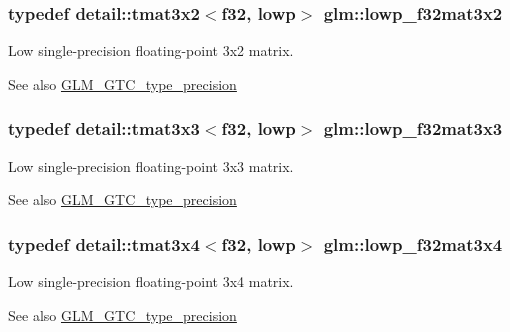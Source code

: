 \subsubsection[{\texorpdfstring{lowp\+\_\+f32mat3x2}{lowp_f32mat3x2}}]{\setlength{\rightskip}{0pt plus 5cm}typedef detail\+::tmat3x2$<$f32, lowp$>$ {\bf glm\+::lowp\+\_\+f32mat3x2}}\hypertarget{group__gtc__type__precision_gadf8ee4630e8d2b6ae72293a7c8dff497}{}\label{group__gtc__type__precision_gadf8ee4630e8d2b6ae72293a7c8dff497}
Low single-\/precision floating-\/point 3x2 matrix. \begin{DoxySeeAlso}{See also}
\hyperlink{group__gtc__type__precision}{G\+L\+M\+\_\+\+G\+T\+C\+\_\+type\+\_\+precision} 
\end{DoxySeeAlso}
\subsubsection[{\texorpdfstring{lowp\+\_\+f32mat3x3}{lowp_f32mat3x3}}]{\setlength{\rightskip}{0pt plus 5cm}typedef detail\+::tmat3x3$<$f32, lowp$>$ {\bf glm\+::lowp\+\_\+f32mat3x3}}\hypertarget{group__gtc__type__precision_ga92f4b130a9651c69361600272f113542}{}\label{group__gtc__type__precision_ga92f4b130a9651c69361600272f113542}
Low single-\/precision floating-\/point 3x3 matrix. \begin{DoxySeeAlso}{See also}
\hyperlink{group__gtc__type__precision}{G\+L\+M\+\_\+\+G\+T\+C\+\_\+type\+\_\+precision} 
\end{DoxySeeAlso}
\subsubsection[{\texorpdfstring{lowp\+\_\+f32mat3x4}{lowp_f32mat3x4}}]{\setlength{\rightskip}{0pt plus 5cm}typedef detail\+::tmat3x4$<$f32, lowp$>$ {\bf glm\+::lowp\+\_\+f32mat3x4}}\hypertarget{group__gtc__type__precision_ga7f81032f05c8a1b96b33c328f38c72d3}{}\label{group__gtc__type__precision_ga7f81032f05c8a1b96b33c328f38c72d3}
Low single-\/precision floating-\/point 3x4 matrix. \begin{DoxySeeAlso}{See also}
\hyperlink{group__gtc__type__precision}{G\+L\+M\+\_\+\+G\+T\+C\+\_\+type\+\_\+precision} 
\end{DoxySeeAlso}
